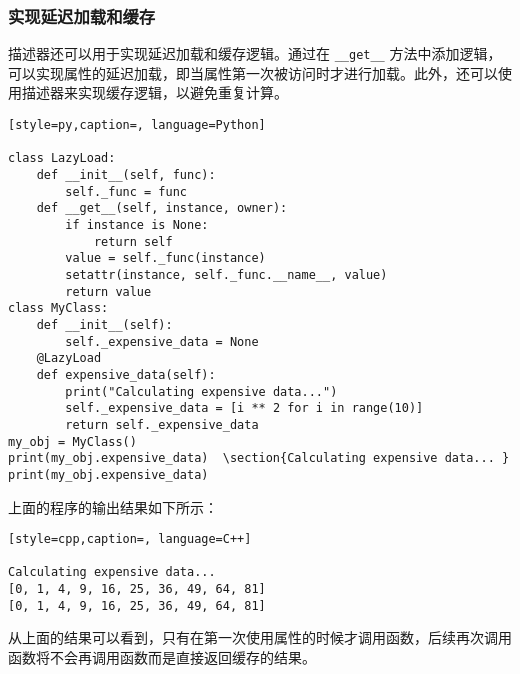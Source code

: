 \subsubsection{实现延迟加载和缓存}
描述器还可以用于实现延迟加载和缓存逻辑。通过在 \verb|__get__| 方法中添加逻辑，可以实现属性的延迟加载，即当属性第一次被访问时才进行加载。此外，还可以使用描述器来实现缓存逻辑，以避免重复计算。
\begin{lstlisting}[style=py,caption=, language=Python]

class LazyLoad:
    def __init__(self, func):
        self._func = func
    def __get__(self, instance, owner):
        if instance is None:
            return self
        value = self._func(instance)
        setattr(instance, self._func.__name__, value)
        return value
class MyClass:
    def __init__(self):
        self._expensive_data = None
    @LazyLoad
    def expensive_data(self):
        print("Calculating expensive data...")
        self._expensive_data = [i ** 2 for i in range(10)]
        return self._expensive_data
my_obj = MyClass()
print(my_obj.expensive_data)  \section{Calculating expensive data... }
print(my_obj.expensive_data)
\end{lstlisting}
上面的程序的输出结果如下所示：
\begin{lstlisting}[style=cpp,caption=, language=C++]

Calculating expensive data...
[0, 1, 4, 9, 16, 25, 36, 49, 64, 81]
[0, 1, 4, 9, 16, 25, 36, 49, 64, 81]
\end{lstlisting}
从上面的结果可以看到，只有在第一次使用属性的时候才调用函数，后续再次调用函数将不会再调用函数而是直接返回缓存的结果。
